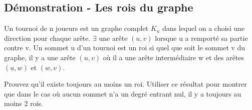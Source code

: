 \subsection{Démonstration - Les rois du graphe}
Un tournoi de n joueurs est un graphe complet $K_{n}$ dans lequel on a choisi une direction pour chaque arête. $\exists$ une arête $(u,v)$ lorsque u a remporté sa partie contre v. Un sommet u d'un tournoi est un roi si quel que soit le sommet v du graphe, il y a une arête $(u,v)$ où il a une arête intermédiaire w et des arêtes $(u,w)$ et $(w,v)$.

Prouvez qu'il existe toujours au moins un roi.
Utiliser ce résultat pour montrer que dans le cas où aucun sommet n'a un degré entrant nul, il y a toujours au moins 2 rois.


